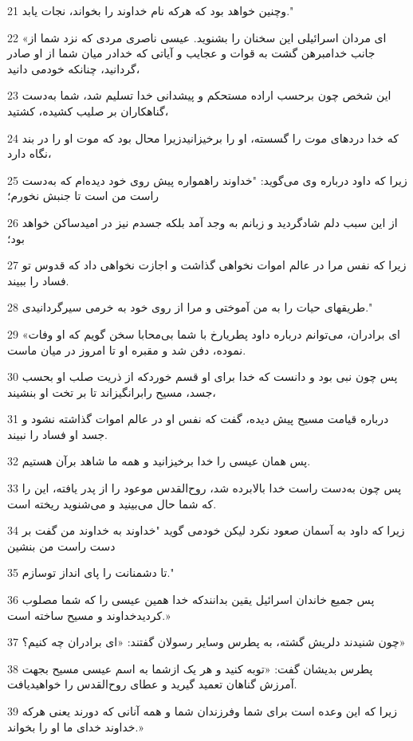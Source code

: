 \par 21 وچنین خواهد بود که هر‌که نام خداوند را بخواند، نجات یابد."
\par 22 «ای مردان اسرائیلی این سخنان را بشنوید. عیسی ناصری مردی که نزد شما از جانب خدامبرهن گشت به قوات و عجایب و آیاتی که خدادر میان شما از او صادر گردانید، چنانکه خودمی دانید،
\par 23 این شخص چون برحسب اراده مستحکم و پیشدانی خدا تسلیم شد، شما به‌دست گناهکاران بر صلیب کشیده، کشتید،
\par 24 که خدا دردهای موت را گسسته، او را برخیزانیدزیرا محال بود که موت او را در بند نگاه دارد،
\par 25 زیرا که داود درباره وی می‌گوید: "خداوند راهمواره پیش روی خود دیده‌ام که به‌دست راست من است تا جنبش نخورم؛
\par 26 از این سبب دلم شادگردید و زبانم به وجد آمد بلکه جسدم نیز در امیدساکن خواهد بود؛
\par 27 زیرا که نفس مرا در عالم اموات نخواهی گذاشت و اجازت نخواهی داد که قدوس تو فساد را ببیند.
\par 28 طریقهای حیات را به من آموختی و مرا از روی خود به خرمی سیرگردانیدی."
\par 29 «ای برادران، می‌توانم درباره داود پطریارخ با شما بی‌محابا سخن گویم که او وفات نموده، دفن شد و مقبره او تا امروز در میان ماست.
\par 30 پس چون نبی بود و دانست که خدا برای او قسم خوردکه از ذریت صلب او بحسب جسد، مسیح رابرانگیزاند تا بر تخت او بنشیند،
\par 31 درباره قیامت مسیح پیش دیده، گفت که نفس او در عالم اموات گذاشته نشود و جسد او فساد را نبیند.
\par 32 پس همان عیسی را خدا برخیزانید و همه ما شاهد برآن هستیم.
\par 33 پس چون به‌دست راست خدا بالابرده شد، روح‌القدس موعود را از پدر یافته، این را که شما حال می‌بینید و می‌شنوید ریخته است.
\par 34 زیرا که داود به آسمان صعود نکرد لیکن خودمی گوید "خداوند به خداوند من گفت بر دست راست من بنشین
\par 35 تا دشمنانت را پای انداز توسازم."
\par 36 پس جمیع خاندان اسرائیل یقین بدانندکه خدا همین عیسی را که شما مصلوب کردیدخداوند و مسیح ساخته است.»
\par 37 چون شنیدند دلریش گشته، به پطرس وسایر رسولان گفتند: «ای برادران چه کنیم؟»
\par 38 پطرس بدیشان گفت: «توبه کنید و هر یک ازشما به اسم عیسی مسیح بجهت آمرزش گناهان تعمید گیرید و عطای روح‌القدس را خواهیدیافت.
\par 39 زیرا که این وعده است برای شما وفرزندان شما و همه آنانی که دورند یعنی هرکه خداوند خدای ما او را بخواند.»
